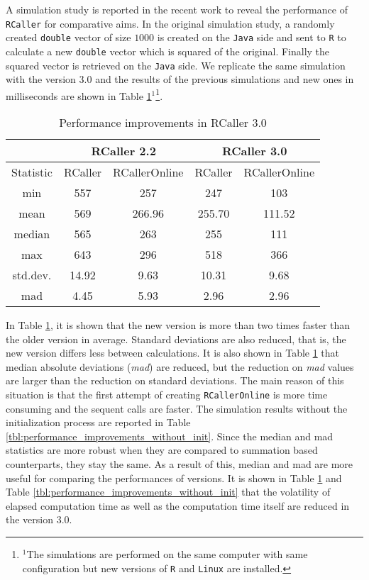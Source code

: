 \documentclass[10pt,a4paper, final, oneside]{article}
\begin{document}
A simulation study is reported in the recent work \cite{satman2014rcaller} to reveal the performance of \texttt{RCaller} for comparative aims. In the original simulation study, a randomly created \texttt{double} vector of size $1000$ is created on the \texttt{Java} side and sent to \texttt{R} to calculate a new  \texttt{double} vector which is squared of the original. Finally the squared vector is retrieved on the \texttt{Java} side. We replicate the same simulation with the version $3.0$ and the results of the previous simulations and new ones in milliseconds are shown in Table \ref{tbl:performance_improvements}$^1$\footnote{$^1$The simulations are performed on the same computer with same configuration but new versions of \texttt{R} and \texttt{Linux} are installed.}. 

\begin{table}[H]
\begin{center}
\caption{Performance improvements in RCaller 3.0}
\label{tbl:performance_improvements}
\begin{tabular}{|c|cc ||cc|}
\hline
          & \multicolumn{2}{c||}{RCaller 2.2}  &\multicolumn{2}{c|}{RCaller 3.0} \\
\hline
Statistic & RCaller & RCallerOnline & RCaller & RCallerOnline \\
\hline
min       & 557     & 257           & 247     & 103    \\
mean      & 569     & 266.96        & 255.70  & 111.52 \\
median    & 565     & 263           & 255     & 111    \\
max       & 643     & 296           & 518     & 366    \\
\hline
std.dev.  & 14.92   & 9.63          & 10.31   & 9.68   \\
mad       & 4.45    & 5.93          & 2.96    & 2.96   \\
\hline
\end{tabular}
\end{center}
\end{table}

In Table \ref{tbl:performance_improvements}, it is shown that the new version is more than two times faster
than the older version in average. Standard deviations are also reduced, that is, the new version differs less between calculations. It is also shown in Table \ref{tbl:performance_improvements} that median absolute deviations (\emph{mad}) are reduced, but the reduction on \emph{mad} values are larger than the reduction on standard deviations. The main reason of this situation is that the first attempt of creating \texttt{RCallerOnline} is more time consuming and the sequent calls are faster. The simulation results without the initialization process are reported in Table \ref{tbl:performance_improvements_without_init}. 
Since the median and mad statistics are more robust when they are compared to summation based counterparts, they stay the same. As a result of this, median and mad are more useful for comparing the performances of versions. It is shown in Table \ref{tbl:performance_improvements} and Table \ref{tbl:performance_improvements_without_init} that the volatility of elapsed computation time as well as the computation time itself are reduced in the version $3.0$. 
\end{document}
